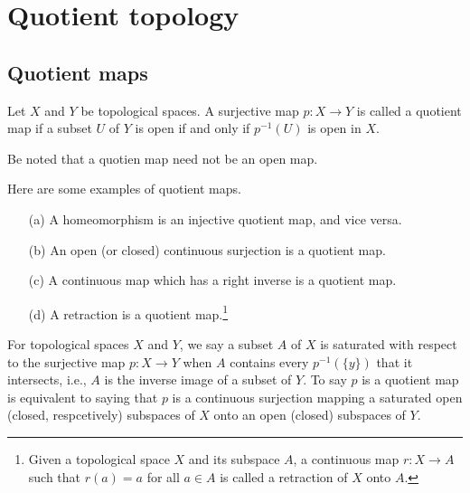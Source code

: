 \section{Quotient topology}

\subsection{Quotient maps}

\begin{defi}
    Let $X$ and $Y$ be topological spaces.
    A surjective map $p: X\rightarrow Y$ is called a quotient map if a subset $U$ of $Y$ is open if and only if $p^{-1}(U)$ is open in $X$.
\end{defi}
\begin{rmk}
    Be noted that a quotien map need not be an open map.
\end{rmk}
\begin{exmp}
    Here are some examples of quotient maps.
    \begin{enumerate}
        \item[(a)]
        {
            A homeomorphism is an injective quotient map, and vice versa.
        }
        \item[(b)]
        {
            An open (or closed) continuous surjection is a quotient map.
        }
        \item[(c)]
        {
            A continuous map which has a right inverse is a quotient map.
        }
        \item[(d)]
        {
            A retraction is a quotient map.\footnote{Given a topological space $X$ and its subspace $A$, a continuous map $r: X\rightarrow A$ such that $r(a)=a$ for all $a\in A$ is called a retraction of $X$ onto $A$.}
        }
    \end{enumerate}
\end{exmp}

For topological spaces $X$ and $Y$, we say a subset $A$ of $X$ is saturated with respect to the surjective map $p: X\rightarrow Y$ when $A$ contains every $p^{-1}(\{y\})$ that it intersects, i.e., $A$ is the inverse image of a subset of $Y$.
To say $p$ is a quotient map is equivalent to saying that $p$ is a continuous surjection mapping a saturated open (closed, respcetively) subspaces of $X$ onto an open (closed) subspaces of $Y$.


